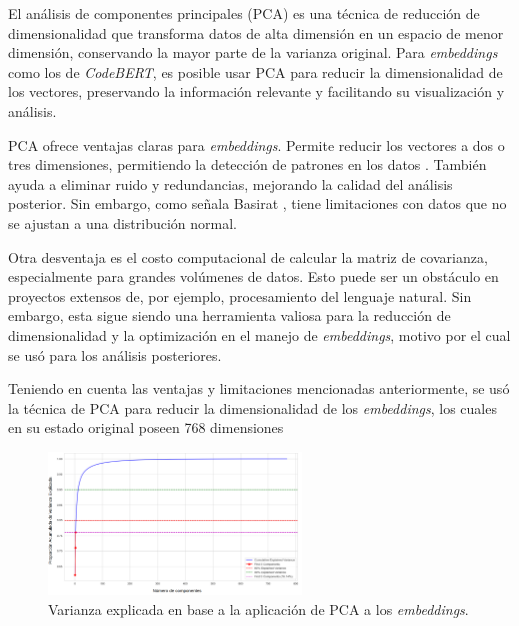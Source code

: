 \documentclass[11pt,a4paper,twoside,openany]{tesis}
\begin{document}
El análisis de componentes principales (PCA) es una técnica de reducción de dimensionalidad que transforma datos de alta dimensión en un espacio de menor dimensión, conservando la mayor parte de la varianza original. Para \emph{embeddings} como los de \emph{CodeBERT}, es posible usar PCA para reducir la dimensionalidad de los vectores, preservando la información relevante y facilitando su visualización y análisis\cite{pca-musil}.

PCA ofrece ventajas claras para \emph{embeddings}. Permite reducir los vectores a dos o tres dimensiones, permitiendo la detección de patrones en los datos \cite{pca-musil}. También ayuda a eliminar ruido y redundancias, mejorando la calidad del análisis posterior. Sin embargo, como señala Basirat \cite{pca-basirat}, tiene limitaciones con datos que no se ajustan a una distribución normal.

Otra desventaja es el costo computacional de calcular la matriz de covarianza, especialmente para grandes volúmenes de datos. Esto puede ser un obstáculo en proyectos extensos de, por ejemplo, procesamiento del lenguaje natural\cite{pca-basirat}. Sin embargo, esta sigue siendo una herramienta valiosa para la reducción de dimensionalidad y la optimización en el manejo de \emph{embeddings}, motivo por el cual se usó para los análisis posteriores.

Teniendo en cuenta las ventajas y limitaciones mencionadas anteriormente, se usó la técnica de  PCA para reducir la dimensionalidad de los \emph{embeddings}, los cuales en su estado original poseen 768 dimensiones

\begin{figure}[H]
    \centering
    \includegraphics[width=0.6\textwidth]{imagenes/varianza-explicada.png}
    \caption{Varianza explicada en base a la aplicación de PCA a los \emph{embeddings}.}
    \label{varianzaPCA}
\end{figure}
\end{document}

